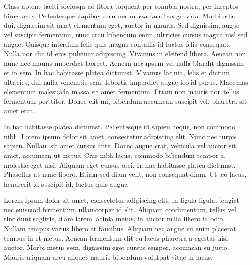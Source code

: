 \documentclass[letterpaper,12pt,twocolumn,landscape]{memoir}
\begin{document}
Class aptent taciti sociosqu ad litora torquent per conubia nostra, per inceptos himenaeos. Pellentesque dapibus arcu nec massa faucibus gravida. Morbi odio dui, dignissim sit amet elementum eget, auctor in mauris. Sed dignissim, augue vel suscipit fermentum, nunc arcu bibendum enim, ultricies cursus magna nisl sed augue. Quisque interdum felis quis magna convallis id luctus felis consequat. Nulla non dui id eros pulvinar adipiscing. Vivamus in eleifend libero. Aenean non nunc nec mauris imperdiet laoreet. Aenean nec ipsum vel nulla blandit dignissim et in sem. In hac habitasse platea dictumst. Vivamus lacinia, felis et dictum ultricies, dui nulla venenatis sem, lobortis imperdiet augue leo id purus. Maecenas elementum malesuada massa sit amet fermentum. Etiam non mauris non tellus fermentum porttitor. Donec elit mi, bibendum accumsan suscipit vel, pharetra sit amet erat.

In hac habitasse platea dictumst. Pellentesque id sapien neque, non commodo nibh. Lorem ipsum dolor sit amet, consectetur adipiscing elit. Nunc nec turpis sapien. Nullam sit amet cursus ante. Donec augue erat, vehicula vel auctor sit amet, accumsan ut metus. Cras nibh lacus, commodo bibendum tempor a, molestie eget nisi. Aliquam eget cursus orci. In hac habitasse platea dictumst. Phasellus at nunc libero. Etiam sed diam velit, non consequat diam. Ut leo lacus, hendrerit id suscipit id, luctus quis augue.

Lorem ipsum dolor sit amet, consectetur adipiscing elit. In ligula ligula, feugiat nec euismod fermentum, ullamcorper id elit. Aliquam condimentum, tellus vel tincidunt sagittis, diam lorem lacinia metus, in auctor nulla libero in odio. Nullam tempus varius libero at faucibus. Aliquam nec augue eu enim placerat tempus in et metus. Aenean fermentum elit eu lacus pharetra a egestas nisi auctor. Morbi metus sem, dignissim eget cursus semper, accumsan eu justo. Mauris aliquam arcu aliquet mauris bibendum volutpat vitae in lacus.
\end{document}
